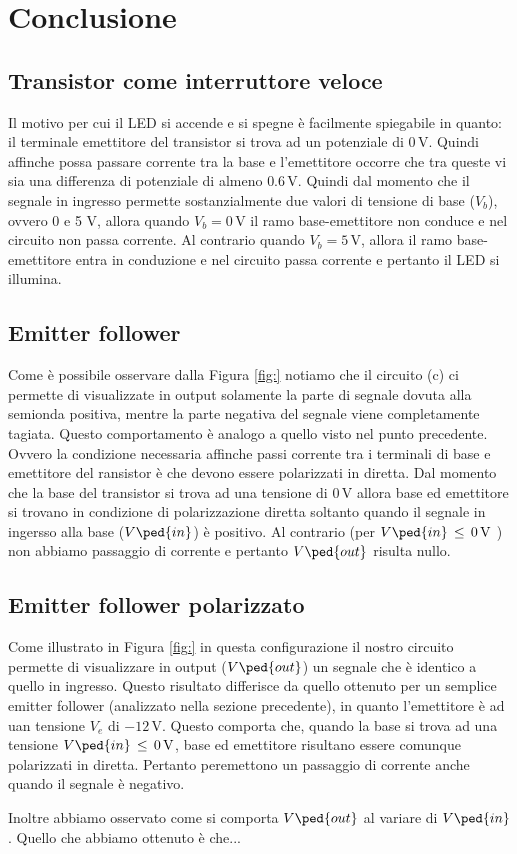 \section*{Conclusione}

\subsection*{Transistor come interruttore veloce}

Il motivo per cui il LED si accende e si spegne è facilmente spiegabile in quanto: il terminale emettitore del transistor si trova ad un potenziale di $0\,\si{\volt}$. Quindi affinche possa passare corrente tra la base e l'emettitore occorre che tra queste vi sia una differenza di potenziale di almeno $0.6\,\si{\volt}$. Quindi dal momento che il segnale in ingresso permette sostanzialmente due valori di tensione di base ($V_b$), ovvero 0 e 5 $\si{\volt}$, allora quando $V_b=0\,\si{\volt}$ il ramo base-emettitore non conduce e nel circuito non passa corrente. Al contrario quando $V_b=5\,\si{\volt}$, allora il ramo base-emettitore entra in conduzione e nel circuito passa corrente e pertanto il LED si illumina.

\subsection*{Emitter follower}

Come è possibile osservare dalla Figura \ref{fig:} notiamo che il circuito (c) ci permette di visualizzate in output solamente la parte di segnale dovuta alla semionda positiva, mentre la parte negativa del segnale viene completamente tagiata. Questo comportamento è analogo a quello visto nel punto precedente. Ovvero la condizione necessaria affinche passi corrente tra i terminali di base e emettitore del ransistor è che devono essere polarizzati in diretta. Dal momento che la base del transistor si trova ad una tensione di $0\,\si{\volt}$ allora base ed emettitore si trovano in condizione di polarizzazione diretta soltanto quando il segnale in ingersso alla base ($V\ped{in}$) è positivo. Al contrario (per $V\ped{in}\,\leq\,0\,\si{\volt}$ ) non abbiamo passaggio di corrente e pertanto $V\ped{out}$ risulta nullo.

\subsection*{Emitter follower polarizzato}

Come illustrato in Figura \ref{fig:} in questa configurazione il nostro circuito permette di visualizzare in output ($V\ped{out}$) un segnale che è identico a quello in ingresso. Questo risultato differisce da quello ottenuto per un semplice emitter follower (analizzato nella sezione precedente), in quanto l'emettitore è ad uan tensione $V_e$ di $-12\,\si{\volt}$. Questo comporta che, quando la base si trova ad una tensione $V\ped{in}\,\leq\,0\,\si{\volt}$, base ed emettitore risultano essere comunque polarizzati in diretta. Pertanto peremettono un passaggio di corrente anche quando il segnale è negativo.

Inoltre abbiamo osservato come si comporta $V\ped{out}$ al variare di $V\ped{in}$. Quello che abbiamo ottenuto è che...
